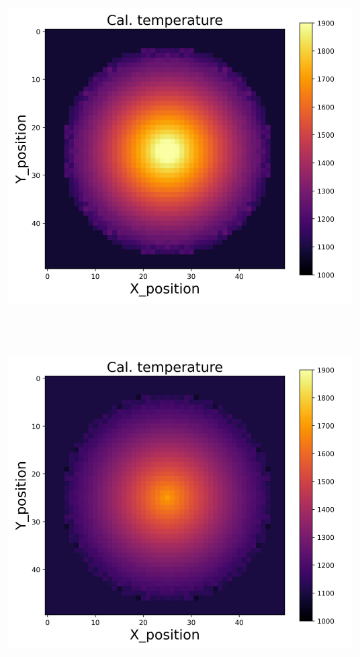 {\begin{figure}[p]
\begin{minipage}{\textwidth}
\begin{subfigure}{0.325\textwidth}
        \end{subfigure}
        \begin{subfigure}{0.325\textwidth}
            \centering
            \includegraphics[width=\textwidth]{figures/raw_data/24/exp/T_cal.jpg}
        \end{subfigure}
    \end{minipage}\\
    \begin{minipage}{\textwidth}
        \centering
        \begin{subfigure}{0.325\textwidth}
            \centering
            \includegraphics[width=\textwidth]{figures/raw_data/25/exp/T_cal.jpg}

\end{subfigure}
\end{minipage}
\end{figure}}

